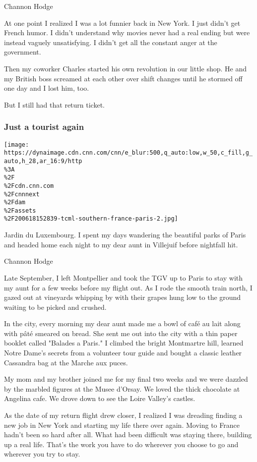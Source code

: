 Channon Hodge

At one point I realized I was a lot funnier back in New York. I just
didn't get French humor. I didn't understand why movies never had a real
ending but were instead vaguely unsatisfying. I didn't get all the
constant anger at the government.

Then my coworker Charles started his own revolution in our little shop.
He and my British boss screamed at each other over shift changes until
he stormed off one day and I lost him, too.

But I still had that return ticket.

\hypertarget{just-a-tourist-again}{%
\subsubsection{Just a tourist again}\label{just-a-tourist-again}}

\texttt{[image: https://dynaimage.cdn.cnn.com/cnn/e\_blur:500,q\_auto:low,w\_50,c\_fill,g\_auto,h\_28,ar\_16:9/http\\\%3A\\\%2F\\\%2Fcdn.cnn.com\\\%2Fcnnnext\\\%2Fdam\\\%2Fassets\\\%2F200618152839-tcml-southern-france-paris-2.jpg]}

Jardin du Luxembourg. I spent my days wandering the beautiful parks of
Paris and headed home each night to my dear aunt in Villejuif before
nightfall hit.

Channon Hodge

Late September, I left Montpellier and took the TGV up to Paris to stay
with my aunt for a few weeks before my flight out. As I rode the smooth
train north, I gazed out at vineyards whipping by with their grapes hung
low to the ground waiting to be picked and crushed.

In the city, every morning my dear aunt made me a bowl of café au lait
along with pâté smeared on bread. She sent me out into the city with a
thin paper booklet called "Balades a Paris." I climbed the bright
Montmartre hill, learned Notre Dame's secrets from a volunteer tour
guide and bought a classic leather Cassandra bag at the Marche aux
puces.

My mom and my brother joined me for my final two weeks and we were
dazzled by the marbled figures at the Musee d'Orsay. We loved the thick
chocolate at Angelina cafe. We drove down to see the Loire Valley's
castles.

As the date of my return flight drew closer, I realized I was dreading
finding a new job in New York and starting my life there over again.
Moving to France hadn't been so hard after all. What had been difficult
was staying there, building up a real life. That's the work you have to
do wherever you choose to go and wherever you try to stay.

